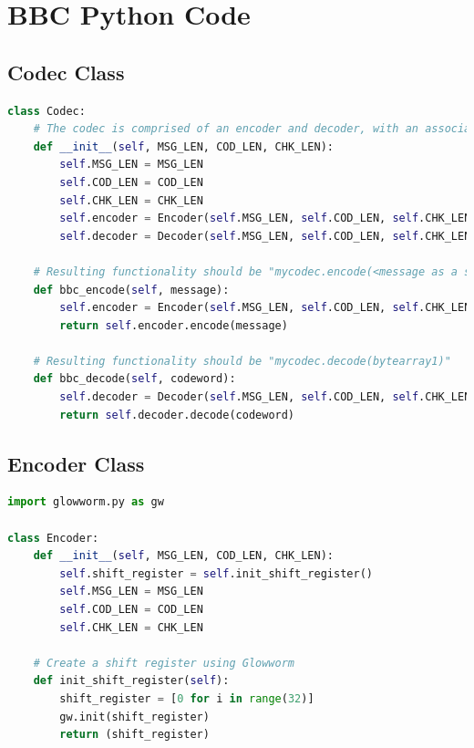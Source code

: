 \documentclass[conference]{IEEEtran}
\begin{document}
{\onecolumn
\newpage

\renewcommand\thesubsection{\arabic{subsection}}

\appendices
\section{BBC Python Code}


\subsection{Codec Class}
\label{PyCodec}
\lstset{style=2ndstyle}
\begin{lstlisting}[language=Python]
class Codec:
    # The codec is comprised of an encoder and decoder, with an associated message/codeword pair
    def __init__(self, MSG_LEN, COD_LEN, CHK_LEN):
        self.MSG_LEN = MSG_LEN
        self.COD_LEN = COD_LEN
        self.CHK_LEN = CHK_LEN
        self.encoder = Encoder(self.MSG_LEN, self.COD_LEN, self.CHK_LEN)
        self.decoder = Decoder(self.MSG_LEN, self.COD_LEN, self.CHK_LEN)

    # Resulting functionality should be "mycodec.encode(<message as a string>)"
    def bbc_encode(self, message):
        self.encoder = Encoder(self.MSG_LEN, self.COD_LEN, self.CHK_LEN)
        return self.encoder.encode(message)

    # Resulting functionality should be "mycodec.decode(bytearray1)"
    def bbc_decode(self, codeword):
        self.decoder = Decoder(self.MSG_LEN, self.COD_LEN, self.CHK_LEN)
        return self.decoder.decode(codeword)
\end{lstlisting}  


\subsection{Encoder Class}
\label{PyEncoder}
\begin{lstlisting}[language=Python]
import glowworm.py as gw

class Encoder:
    def __init__(self, MSG_LEN, COD_LEN, CHK_LEN):
        self.shift_register = self.init_shift_register()
        self.MSG_LEN = MSG_LEN
        self.COD_LEN = COD_LEN
        self.CHK_LEN = CHK_LEN

    # Create a shift register using Glowworm
    def init_shift_register(self):
        shift_register = [0 for i in range(32)]
        gw.init(shift_register)
        return (shift_register)


\end{lstlisting}}
\end{document}
